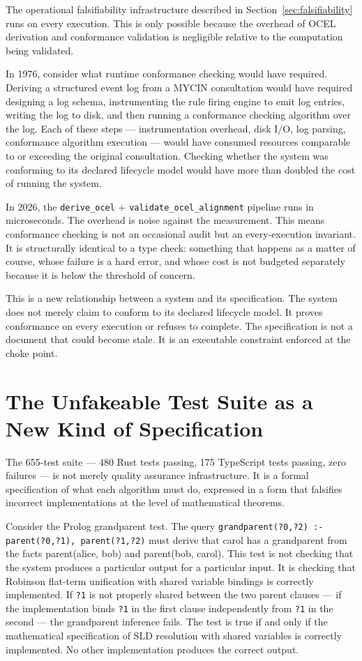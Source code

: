 The operational falsifiability infrastructure described in Section~\ref{sec:falsifiability}
runs on every execution. This is only possible because the overhead of OCEL derivation and
conformance validation is negligible relative to the computation being validated.

In 1976, consider what runtime conformance checking would have required. Deriving a structured
event log from a MYCIN consultation would have required designing a log schema, instrumenting
the rule firing engine to emit log entries, writing the log to disk, and then running a
conformance checking algorithm over the log. Each of these steps --- instrumentation overhead,
disk I/O, log parsing, conformance algorithm execution --- would have consumed resources
comparable to or exceeding the original consultation. Checking whether the system was
conforming to its declared lifecycle model would have more than doubled the cost of running
the system.

In 2026, the \texttt{derive\_ocel} + \texttt{validate\_ocel\_alignment} pipeline runs in
microseconds. The overhead is noise against the measurement. This means conformance checking
is not an occasional audit but an every-execution invariant. It is structurally identical
to a type check: something that happens as a matter of course, whose failure is a hard error,
and whose cost is not budgeted separately because it is below the threshold of concern.

This is a new relationship between a system and its specification. The system does not merely
claim to conform to its declared lifecycle model. It proves conformance on every execution or
refuses to complete. The specification is not a document that could become stale. It is an
executable constraint enforced at the choke point.

\section{The Unfakeable Test Suite as a New Kind of Specification}
\label{sec:specification}

The 655-test suite --- 480 Rust tests passing, 175 TypeScript tests passing, zero failures ---
is not merely quality assurance infrastructure. It is a formal specification of what each
algorithm must do, expressed in a form that falsifies incorrect implementations at the level
of mathematical theorems.

Consider the Prolog grandparent test. The query
\texttt{grandparent(?0,?2) :- parent(?0,?1), parent(?1,?2)} must derive that carol has a
grandparent from the facts parent(alice, bob) and parent(bob, carol). This test is not
checking that the system produces a particular output for a particular input. It is checking
that Robinson flat-term unification with shared variable bindings is correctly implemented.
If \texttt{?1} is not properly shared between the two parent clauses --- if the implementation
binds \texttt{?1} in the first clause independently from \texttt{?1} in the second --- the
grandparent inference fails. The test is true if and only if the mathematical specification
of SLD resolution with shared variables is correctly implemented. No other implementation
produces the correct output.


